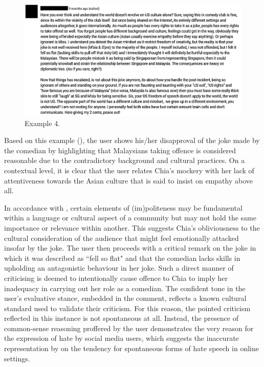 \documentclass[english]{textolivre}
\begin{document}
\begin{figure}[h!]
    \centering
    \begin{minipage}{0.80\linewidth}
    \includegraphics[width=\linewidth]{imagens/figura6.png}
    \caption{Example 4.}
    \label{example-4}
    \end{minipage}
\end{figure}

Based on this example (), the user shows his/her disapproval of the joke made by the comedian by highlighting that Malaysians taking offence is considered reasonable due to the contradictory background and cultural practices. On a contextual level, it is clear that the user relates Chia’s mockery with her lack of attentiveness towards the Asian culture that is said to insist on empathy above all.

In accordance with \textcite{spencer-oatey2016}, certain elements of (im)politeness may be fundamental within a language or cultural aspect of a community but may not hold the same importance or relevance within another. This suggests Chia’s obliviousness to the cultural consideration of the audience that might feel emotionally attacked insofar by the joke. The user then proceeds with a critical remark on the joke in which it was described as ``fell so flat" and that the comedian lacks skills in upholding an antagonistic behaviour in her joke. Such a direct manner of criticising is deemed to intentionally cause offence to Chia to imply her inadequacy in carrying out her role as a comedian. The confident tone in the user's evaluative stance, embedded in the comment, reflects a known cultural standard used to validate their criticism. For this reason, the pointed criticism reflected in this instance is not spontaneous at all. Instead, the presence of common-sense reasoning proffered by the user demonstrates the very reason for the expression of hate by social media users, which suggests the inaccurate representation by \textcite{brown2018} on the tendency for spontaneous forms of hate speech in online settings.
\end{document}
